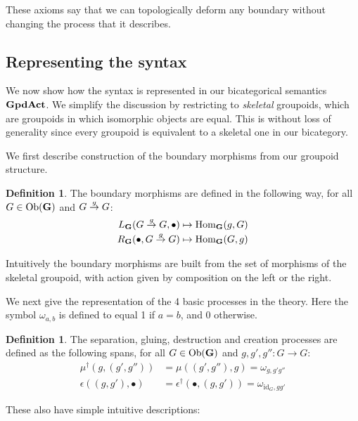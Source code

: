 \documentclass[a4paper,12pt]{article}
\theoremstyle{definition}
\newtheorem{defn}[theorem]{Definition}
\newcommand\cat[1]{{\ensuremath{\bf #1}}}
\renewcommand{\-}[0]{\nobreakdash-\hspace{0pt}}
\newcommand\Ob{\ensuremath{\mathrm{Ob}}}
\newcommand\Hom{\ensuremath{\mathrm{Hom}}}
\newcommand\id{\ensuremath{\mathrm{id}}}
\newcommand\GA{\cat{GpdAct}{}}
\newcommand\GB{\ensuremath{R_{\cat G}}}
\newcommand\BG{\ensuremath{L _{\cat G}}}
\newcommand\xto[1]{\ensuremath{\smash{{}\stackrel{\smash{#1}}{\to}{}}}}
\begin{document}
These axioms say that we can topologically deform any boundary without changing the process that it describes.

\subsection{Representing the syntax}
\label{sec:representation}

\noindent
We now show how the syntax is represented in our bicategorical semantics \GA. We simplify the discussion by restricting to \textit{skeletal} groupoids, which are groupoids in which isomorphic objects are equal. This is without loss of generality since every groupoid is equivalent to a skeletal one in our bicategory.

We first describe construction of the boundary morphisms from our groupoid structure.
\begin{defn}
The boundary morphisms are defined in the following way, for all $G \in \Ob(\cat G)$ and $G \xto g G$:
\begin{align*}
\BG (G \xto g G, \bullet) &\mapsto \Hom _{\cat G} (g, G)
\\
\GB (\bullet, G \xto g G) &\mapsto \Hom _{\cat G} (G, g)
\end{align*}
\end{defn}

\noindent
Intuitively the boundary morphisms are built from the set of morphisms of the skeletal groupoid, with action given by composition on the left or the right.

We next give the representation of the 4 basic processes in the theory. Here the symbol $\omega _{a,b}$ is defined to equal 1 if $a=b$, and 0 otherwise.
\begin{defn}
The separation, gluing, destruction and creation processes are defined as the following spans, for all $G \in \Ob(\cat G)$ and $g,g',g'': G \to G$:
\begin{align*}
\mu ^\dag (g, (g', g'')) &= \mu ((g', g''), g) = \omega _{g, g'g''}
\\
\epsilon((g,g'), \bullet) &=\epsilon ^\dag (\bullet, (g,g')) = \omega _{\id_G, gg'}
\end{align*}
\end{defn}

\noindent
These also have simple intuitive descriptions:
\end{document}
